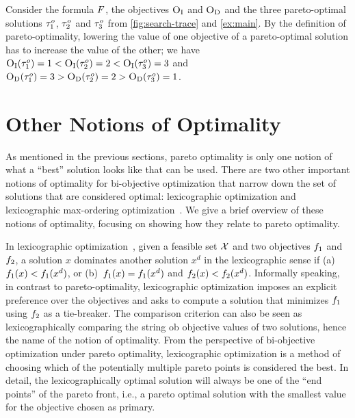 \begin{example}
  Consider the formula $F$, the objectives $\textsc{O}_{\text{I}}$ and $\textsc{O}_{\text{D}}$ and the three pareto-optimal solutions $\tau^o_1$, $\tau^o_2$ and $\tau^o_3$ from \cref{fig:search-trace} and \cref{ex:main}.
  By the definition of pareto-optimality, lowering the value of one objective of a pareto-optimal solution has to increase the value of the other;
  we have $\textsc{O}_{\text{I}}(\tau^o_1) = 1 < \textsc{O}_{\text{I}}(\tau^o_2) = 2 < \textsc{O}_{\text{I}}(\tau^o_3) = 3$ and $\textsc{O}_{\text{D}}(\tau^o_1) = 3 > \textsc{O}_{\text{D}}(\tau^o_2) = 2 > \textsc{O}_{\text{D}}(\tau^o_3) = 1$.
\end{example}

\section{Other Notions of Optimality}

As mentioned in the previous sections, pareto optimality is only one notion of what a ``best'' solution looks like that can be used.
There are two other important notions of optimality for bi-objective optimization that narrow down the set of solutions that are considered optimal:
lexicographic optimization and lexicographic max-ordering optimization~\autocite{Ehrgott2005-5}.
We give a brief overview of these notions of optimality, focusing on showing how they relate to pareto optimality.

In lexicographic optimization~\autocite{Ehrgott2005-5}, given a feasible set $\mathcal{X}$ and two objectives $f_1$ and $f_2$, a solution $x$ dominates another solution $x^d$ in the lexicographic sense if (a)~$f_1(x) < f_1(x^d)$, or (b)~$f_1(x) = f_1(x^d)$ and $f_2(x) < f_2(x^d)$.
Informally speaking, in contrast to pareto-optimality, lexicographic optimization imposes an explicit preference over the objectives and asks to compute a solution that minimizes $f_1$ using $f_2$ as a tie-breaker.
The comparison criterion can also be seen as lexicographically comparing the string ob objective values of two solutions, hence the name of the notion of optimality.
From the perspective of bi-objective optimization under pareto optimality, lexicographic optimization is a method of choosing which of the potentially multiple pareto points is considered the best.
In detail, the lexicographically optimal solution will always be one of the ``end points'' of the pareto front, i.e., a pareto optimal solution with the smallest value for the objective chosen as primary.


